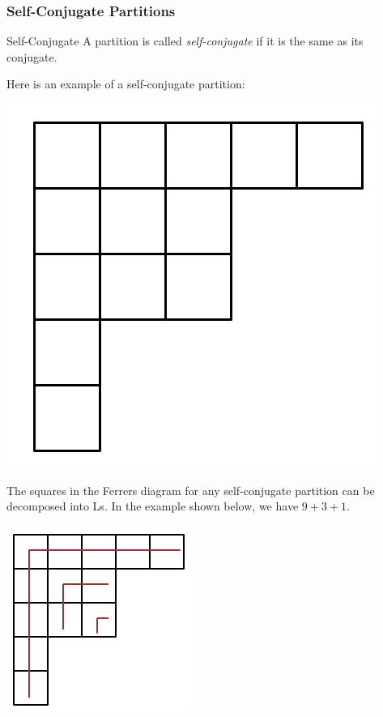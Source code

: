 \documentclass[letterpaper]{article}
\begin{document}
\subsubsection{Self-Conjugate Partitions}
\begin{definition}{Self-Conjugate}{}
    A partition is called \emph{self-conjugate} if it is the same as its conjugate. 
\end{definition}
Here is an example of a self-conjugate partition:
\begin{center}
    \includegraphics[scale=0.3]{self_c.PNG}
\end{center}
The squares in the Ferrers diagram for any self-conjugate partition can be decomposed into Ls. In the example shown below, we have $9 + 3 + 1$. 
\begin{center}
    \includegraphics[scale=0.8]{self_c_L.PNG}
\end{center}
 
\end{document}
